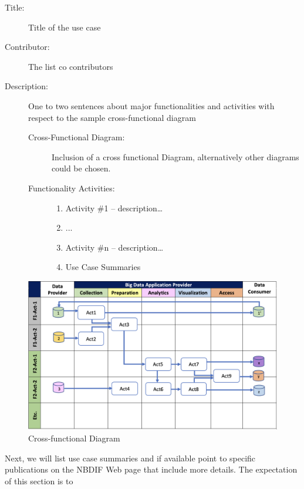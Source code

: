 \documentclass[12pt]{article}
\begin{document}
\begin{description}
\item[Title:] 		Title of the use case
\item[Contributor:] 	The list co contributors
\item[Description:] 	One to two sentences about major functionalities and activities with respect to the sample cross-functional diagram
	
	\begin{description}
	\item[Cross-Functional Diagram:]
		Inclusion of a cross functional Diagram, alternatively other diagrams could be 			chosen.
	\item[Functionality Activities:]
	\begin{enumerate}
        \item Activity \#1 – description…
        \item ...
        \item Activity \#n – description…
    	\item Use Case Summaries
    \end{enumerate}
\end{description}
\end{description}

\begin{figure}[htb]
    \centering
    \includegraphics[width=1.0\textwidth]{images/cross-functional-diagram.png}
    \caption{Cross-functional Diagram}
    \label{fig:cross-functional-diagram}
\end{figure}


Next, we will list use case summaries and if available point to specific publications on the NBDIF Web page that include more details. The expectation of this section is to
 
\end{document}
